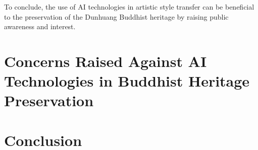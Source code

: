 To conclude, the use of AI technologies in artistic style transfer can be beneficial to the preservation of
the Dunhuang Buddhist heritage by raising public awareness and interest.

\section{Concerns Raised Against AI Technologies in Buddhist Heritage Preservation}

\section{Conclusion}

\printbibliography